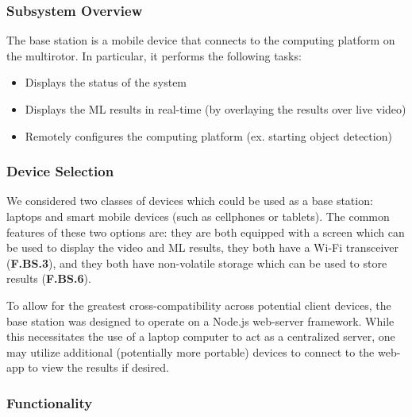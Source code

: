 \subsubsection{Subsystem Overview}

The base station is a mobile device that connects to the computing platform on the multirotor. In particular, it performs the following tasks:
\begin{itemize}
    \item Displays the status of the system
    \item Displays the ML results in real-time (by overlaying the results over live video)
    \item Remotely configures the computing platform (ex. starting object detection)
\end{itemize}

\subsubsection{Device Selection}
We considered two classes of devices which could be used as a base station: laptops and smart mobile devices (such as cellphones or tablets). The common features of these two options are: they are both equipped with a screen which can be used to display the video and ML results, they both have a Wi-Fi transceiver (\textbf{F.BS.3}), and they both have non-volatile storage which can be used to store results (\textbf{F.BS.6}).

To allow for the greatest cross-compatibility across potential client devices, the base station was designed to operate on a Node.js web-server framework. While this necessitates the use of a laptop computer to act as a centralized server, one may utilize additional (potentially more portable) devices to connect to the web-app to view the results if desired.

\subsubsection{Functionality}

